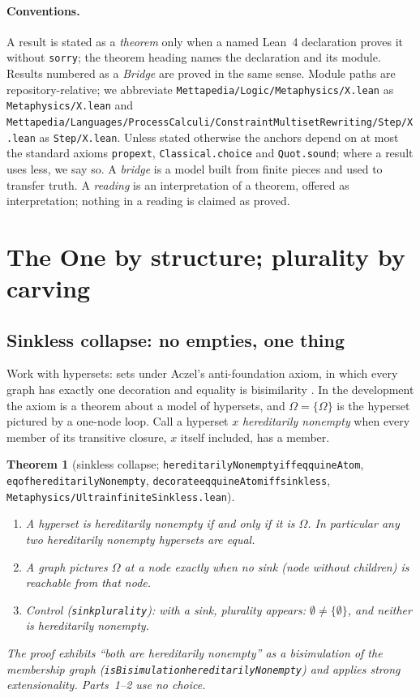 \documentclass[]{article}
\newtheorem{theorem}{Theorem}
\theoremstyle{definition}
\theoremstyle{remark}
\newcommand{\codeus}{\textunderscore\allowbreak}
\newcommand{\code}[1]{\texttt{\let\_\codeus #1}}
\newcommand{\lpath}[1]{{\ttfamily\nolinkurl{#1}}}
\newcommand{\Om}{\Omega}
\newcommand{\meta}[1]{\lpath{Metaphysics/#1.lean}}
\newcommand{\step}[1]{\lpath{Step/#1.lean}}
\begin{document}
\paragraph{Conventions.} A result is stated as a \emph{theorem} only when a named Lean~4
declaration proves it without \code{sorry}; the theorem heading names the declaration and its
module. Results numbered as a \emph{Bridge} are proved in the same sense. Module paths are
repository-relative; we abbreviate
\lpath{Mettapedia/Logic/Metaphysics/X.lean} as \meta{X} and
\lpath{Mettapedia/Languages/ProcessCalculi/ConstraintMultisetRewriting/Step/X.lean} as \step{X}.
Unless stated otherwise the anchors depend on at most the standard axioms \code{propext},
\code{Classical.choice} and \code{Quot.sound}; where a result uses less, we say so. A
\emph{bridge} is a model built from finite pieces and used to transfer truth. A \emph{reading} is an
interpretation of a theorem, offered as interpretation; nothing in a reading is claimed as proved.

\section{The One by structure; plurality by carving}
\label{sec:one}

\subsection{Sinkless collapse: no empties, one thing}
\label{sec:sinkless}

Work with hypersets: sets under Aczel's anti-foundation axiom, in which every graph has exactly one
decoration and equality is bisimilarity \cite{AczelAFA, BarwiseMoss1996}. In the development the
axiom is a theorem about a model of hypersets, and $\Om=\{\Om\}$ is the hyperset pictured by a
one-node loop. Call a hyperset $x$ \emph{hereditarily nonempty} when every member of its transitive
closure, $x$ itself included, has a member.

\begin{theorem}[sinkless collapse; \code{hereditarilyNonempty\_iff\_eq\_quineAtom},
\code{eq\_of\_hereditarilyNonempty}, \code{decorate\_eq\_quineAtom\_iff\_sinkless}, \meta{UltrainfiniteSinkless}]
\label{thm:sinkless}
\leavevmode
\begin{enumerate}
\item A hyperset is hereditarily nonempty if and only if it is $\Om$. In particular any two
  hereditarily nonempty hypersets are equal.
\item A graph pictures $\Om$ at a node exactly when no sink (node without children) is reachable
  from that node.
\item \emph{Control} (\code{sink\_plurality}): with a sink, plurality appears: $\emptyset\neq\{\emptyset\}$,
  and neither is hereditarily nonempty.
\end{enumerate}
The proof exhibits ``both are hereditarily nonempty'' as a bisimulation of the membership graph
(\code{isBisimulation\_hereditarilyNonempty}) and applies strong extensionality. Parts~1--2 use no
choice.
\end{theorem}
\end{document}
